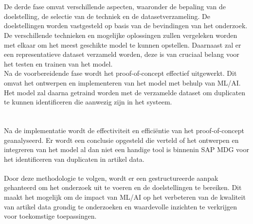 \section{}%
\label{sec:Proof-of-ConceptM}
De derde fase omvat verschillende aspecten, waaronder de bepaling van de doelstelling, de selectie van de techniek en de datasetverzameling. De doelstellingen worden vastgesteld op basis van de bevindingen van het onderzoek. De verschillende technieken en mogelijke oplossingen zullen vergeleken worden met elkaar om het meest geschikte model te kunnen opstellen. Daarnaast zal er een representatieve dataset verzameld worden, deze is van cruciaal belang voor het testen en trainen van het model. 
\\Na de voorbereidende fase wordt het proof-of-concept effectief uitgewerkt. Dit omvat het ontwerpen en implementeren van het model met behulp van ML/AI. Het model zal daarna getraind worden met de verzamelde dataset om duplicaten te kunnen identificeren die aanwezig zijn in het systeem. 


\section{}%
\label{sec:ConclusieM}
Na de implementatie wordt de effectiviteit en efficiëntie van het proof-of-concept geanalyseerd. Er wordt een conclusie opgesteld die verteld of het ontwerpen en integreren van het model al dan niet een handige tool is binnenin SAP MDG voor het identificeren van duplicaten in artikel data. 
\\ \\
Door deze methodologie te volgen, wordt er een gestructureerde aanpak gehanteerd om het onderzoek uit te voeren en de doelstellingen te bereiken. Dit maakt het mogelijk om de impact van ML/AI op het verbeteren van de kwaliteit van artikel data grondig te onderzoeken en waardevolle inzichten te verkrijgen voor toekomstige toepassingen.